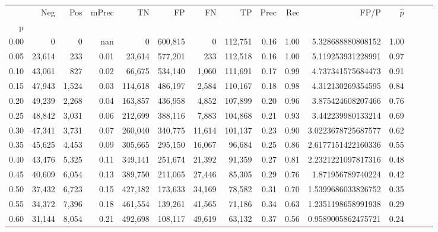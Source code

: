\begin{tabular}{rrrrrrrrrrrrrrr}
\toprule
{} &     Neg &    Pos & mPrec &       TN &       FP &       FN &       TP &  Prec &   Rec &                  FP/P & $\hat{p}$ \\
p    &         &        &       &          &          &          &          &       &       &                       &           \\
\midrule
0.00 &       0 &      0 &   nan &        0 &  600,815 &        0 &  112,751 &  0.16 &  1.00 &     5.328688880808152 &      1.00 \\
0.05 &  23,614 &    233 &  0.01 &   23,614 &  577,201 &      233 &  112,518 &  0.16 &  1.00 &     5.119253931228991 &      0.97 \\
0.10 &  43,061 &    827 &  0.02 &   66,675 &  534,140 &    1,060 &  111,691 &  0.17 &  0.99 &     4.737341575684473 &      0.91 \\
0.15 &  47,943 &  1,524 &  0.03 &  114,618 &  486,197 &    2,584 &  110,167 &  0.18 &  0.98 &     4.312130269354595 &      0.84 \\
0.20 &  49,239 &  2,268 &  0.04 &  163,857 &  436,958 &    4,852 &  107,899 &  0.20 &  0.96 &     3.875424608207466 &      0.76 \\
0.25 &  48,842 &  3,031 &  0.06 &  212,699 &  388,116 &    7,883 &  104,868 &  0.21 &  0.93 &     3.442239980133214 &      0.69 \\
0.30 &  47,341 &  3,731 &  0.07 &  260,040 &  340,775 &   11,614 &  101,137 &  0.23 &  0.90 &    3.0223678725687577 &      0.62 \\
0.35 &  45,625 &  4,453 &  0.09 &  305,665 &  295,150 &   16,067 &   96,684 &  0.25 &  0.86 &    2.6177151422160336 &      0.55 \\
0.40 &  43,476 &  5,325 &  0.11 &  349,141 &  251,674 &   21,392 &   91,359 &  0.27 &  0.81 &    2.2321221097817316 &      0.48 \\
0.45 &  40,609 &  6,054 &  0.13 &  389,750 &  211,065 &   27,446 &   85,305 &  0.29 &  0.76 &     1.871956789740224 &      0.42 \\
0.50 &  37,432 &  6,723 &  0.15 &  427,182 &  173,633 &   34,169 &   78,582 &  0.31 &  0.70 &    1.5399686033826752 &      0.35 \\
0.55 &  34,372 &  7,396 &  0.18 &  461,554 &  139,261 &   41,565 &   71,186 &  0.34 &  0.63 &    1.2351198658991938 &      0.29 \\
0.60 &  31,144 &  8,054 &  0.21 &  492,698 &  108,117 &   49,619 &   63,132 &  0.37 &  0.56 &    0.9589005862475721 &      0.24 \\

\end{tabular}
